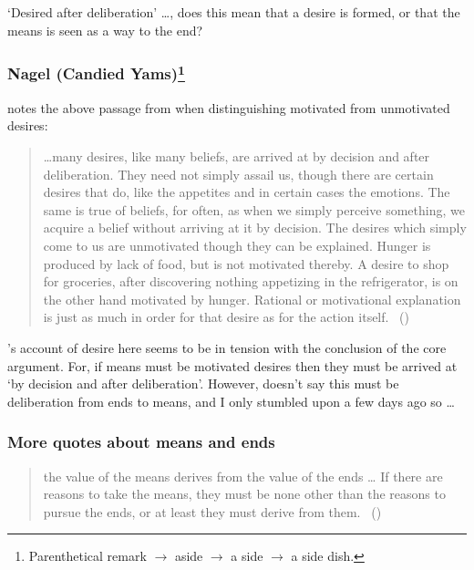 \documentclass[10pt]{article}
\newcommand{\hozline}[0]{%
  \noindent\hdashrule[0.5ex][c]{\textwidth}{.1pt}{}
}
\begin{document}
`Desired after deliberation' \dots, does this mean that a desire is formed, or that the means is seen as a way to the end?

\newpage

\hozline

\subsubsection*{Nagel \hfill (Candied Yams)\footnote{Parenthetical remark \(\to\) aside \(\to\) a side \(\to\) a side dish.}}
\label{sec:nagel}

\citeauthor{Nagel:1970aa} notes the above passage from \citeauthor{Aristotle:2000aa} when distinguishing motivated from unmotivated desires:

\begin{quote}
  \dots many desires, like many beliefs, are arrived at by decision and after deliberation.
  They need not simply assail us, though there are certain desires that do, like the appetites and in certain cases the emotions.
  The same is true of beliefs, for often, as when we simply perceive something, we acquire a belief without arriving at it by decision.
  The desires which simply come to us are unmotivated though they can be explained.
  Hunger is produced by lack of food, but is not motivated thereby.
  A desire to shop for groceries, after discovering nothing appetizing in the refrigerator, is on the other hand motivated by hunger.
  Rational or motivational explanation is just as much in order for that desire as for the action itself.\nolinebreak
  \mbox{ }\hfill(\citeyear[29]{Nagel:1970aa})
\end{quote}

\citeauthor{Nagel:1970aa}'s account of desire here seems to be in tension with the conclusion of the core argument.
For, if means must be motivated desires then they must be arrived at `by decision and after deliberation'.
However, \citeauthor{Nagel:1970aa} doesn't say this must be deliberation from ends to means, and I only stumbled upon  a few days ago so \dots

\hozline

\subsubsection*{More quotes about means and ends}
\label{sec:more-quotes}


\begin{quote}
    the value of the means derives from the value of the ends \dots
    If there are reasons to take the means, they must be none other than the reasons to pursue the ends, or at least they must derive from them.\nolinebreak
  \mbox{ }\hfill(\cite[2]{Raz:2005aa})
\end{quote}
\end{document}
